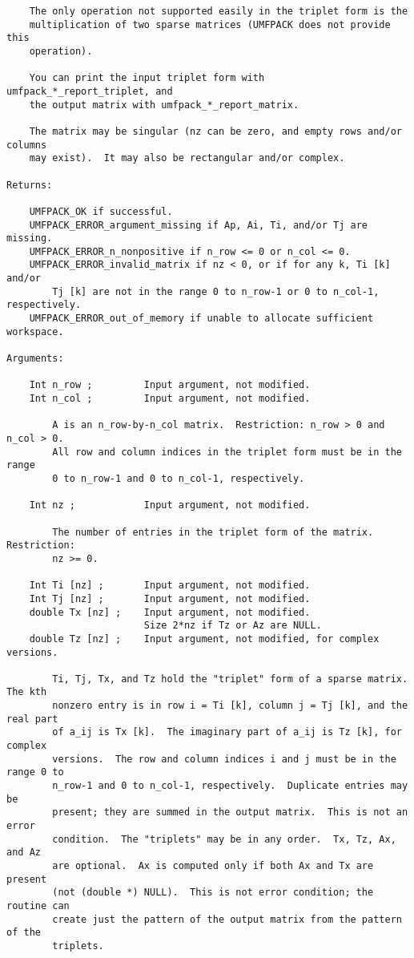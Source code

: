 \documentclass[11pt]{article}
\begin{document}
{\begin{verbatim}
    The only operation not supported easily in the triplet form is the
    multiplication of two sparse matrices (UMFPACK does not provide this
    operation).

    You can print the input triplet form with umfpack_*_report_triplet, and
    the output matrix with umfpack_*_report_matrix.

    The matrix may be singular (nz can be zero, and empty rows and/or columns
    may exist).  It may also be rectangular and/or complex.

Returns:

    UMFPACK_OK if successful.
    UMFPACK_ERROR_argument_missing if Ap, Ai, Ti, and/or Tj are missing.
    UMFPACK_ERROR_n_nonpositive if n_row <= 0 or n_col <= 0.
    UMFPACK_ERROR_invalid_matrix if nz < 0, or if for any k, Ti [k] and/or
        Tj [k] are not in the range 0 to n_row-1 or 0 to n_col-1, respectively.
    UMFPACK_ERROR_out_of_memory if unable to allocate sufficient workspace.

Arguments:

    Int n_row ;         Input argument, not modified.
    Int n_col ;         Input argument, not modified.

        A is an n_row-by-n_col matrix.  Restriction: n_row > 0 and n_col > 0.
        All row and column indices in the triplet form must be in the range
        0 to n_row-1 and 0 to n_col-1, respectively.

    Int nz ;            Input argument, not modified.

        The number of entries in the triplet form of the matrix.  Restriction:
        nz >= 0.

    Int Ti [nz] ;       Input argument, not modified.
    Int Tj [nz] ;       Input argument, not modified.
    double Tx [nz] ;    Input argument, not modified.
                        Size 2*nz if Tz or Az are NULL.
    double Tz [nz] ;    Input argument, not modified, for complex versions.

        Ti, Tj, Tx, and Tz hold the "triplet" form of a sparse matrix.  The kth
        nonzero entry is in row i = Ti [k], column j = Tj [k], and the real part
        of a_ij is Tx [k].  The imaginary part of a_ij is Tz [k], for complex
        versions.  The row and column indices i and j must be in the range 0 to
        n_row-1 and 0 to n_col-1, respectively.  Duplicate entries may be
        present; they are summed in the output matrix.  This is not an error
        condition.  The "triplets" may be in any order.  Tx, Tz, Ax, and Az
        are optional.  Ax is computed only if both Ax and Tx are present
        (not (double *) NULL).  This is not error condition; the routine can
        create just the pattern of the output matrix from the pattern of the
        triplets.


\end{verbatim}}
\end{document}
